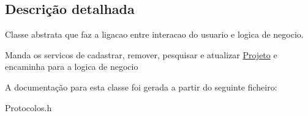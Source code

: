 \subsection{\-Descrição detalhada}
\-Classe abstrata que faz a ligacao entre interacao do usuario e logica de negocio. 

\-Manda os servicos de cadastrar, remover, pesquisar e atualizar \hyperlink{class_projeto}{\-Projeto} e encaminha para a logica de negocio 

\-A documentação para esta classe foi gerada a partir do seguinte ficheiro\-:\begin{DoxyCompactItemize}
\item 
\-Protocolos.\-h\end{DoxyCompactItemize}

